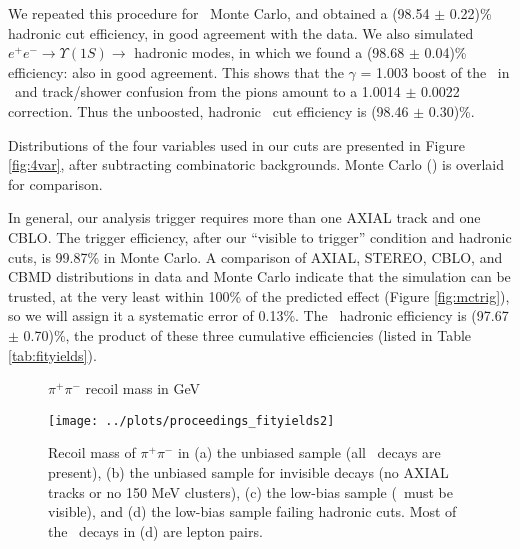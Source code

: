 \documentclass[aps,prd,preprint,superscriptaddress,tightenlines,nofootinbib,floatfix]{revtex4}
\begin{document}
We repeated this procedure for \twotoone\ Monte Carlo, and obtained a
(98.54 $\pm$ 0.22)\% hadronic cut efficiency, in good agreement with
the data.  We also simulated $e^+e^- \to \Upsilon(1S) \to$ hadronic
modes, in which we found a (98.68 $\pm$ 0.04)\% efficiency: also in
good agreement.  This shows that the $\gamma$ = 1.003 boost of the
\uone\ in \twotoone\ and track/shower confusion from the pions amount
to a 1.0014 $\pm$ 0.0022 correction.  Thus the unboosted, hadronic
\uone\ cut efficiency is (98.46 $\pm$ 0.30)\%.

Distributions of the four variables used in our cuts are presented in
Figure \ref{fig:4var}, after subtracting combinatoric backgrounds.
Monte Carlo (\twotoone) is overlaid for comparison.

In general, our analysis trigger requires more than one AXIAL track
and one CBLO.  The trigger efficiency, after our ``visible to
trigger'' condition and hadronic cuts, is 99.87\% in Monte Carlo.  A
comparison of AXIAL, STEREO, CBLO, and CBMD distributions in data and
Monte Carlo indicate that the simulation can be trusted, at the very
least within 100\% of the predicted effect (Figure \ref{fig:mctrig}),
so we will assign it a systematic error of 0.13\%.  The \uone\
hadronic efficiency is (97.67 $\pm$ 0.70)\%, the product of these
three cumulative efficiencies (listed in Table \ref{tab:fityields}).

\begin{figure}[p]
  \vspace{3 cm}
  \begin{center}
    \Large $\pi^+\pi^-$ recoil mass in GeV
  \end{center}

  \vspace{-1.8 cm}
  \begin{center}
    \texttt{[image: ../plots/proceedings\_fityields2]}
  \end{center}
  \caption{\label{fig:recoil} Recoil mass of $\pi^+\pi^-$ in (a) the
    unbiased sample (all \ups\ decays are present), (b) the unbiased
    sample for invisible decays (no AXIAL tracks or no 150 MeV
    clusters), (c) the low-bias sample (\ups\ must be visible), and
    (d) the low-bias sample failing hadronic cuts.  Most of the \uone\
    decays in (d) are lepton pairs.}
\end{figure}
\end{document}
